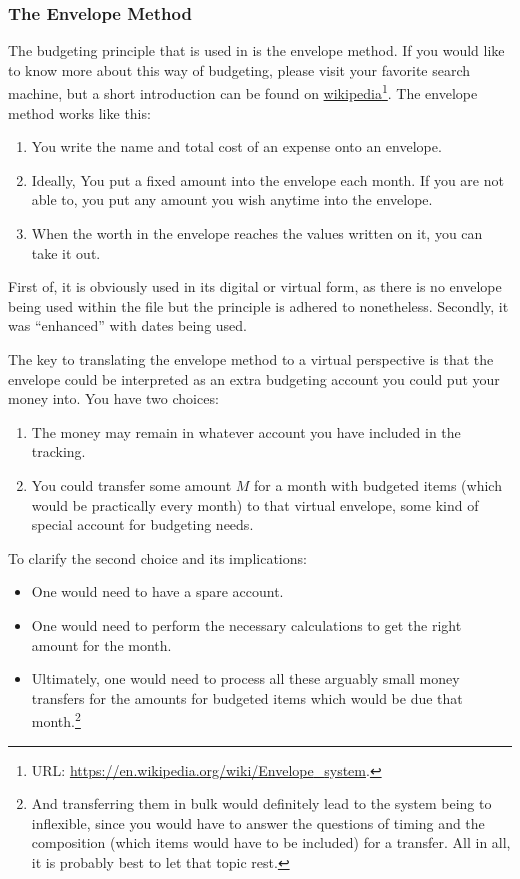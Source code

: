 \subsubsection{The Envelope Method}
\label{subsubsec:budgeting-the-envelope-method}

The budgeting principle that is used in \tfn is the envelope method.
If you would like to know more about this way of budgeting, please visit your favorite search machine, but a short introduction can be found on \href{https://en.wikipedia.org/wiki/Envelope_system}{wikipedia}\footnote{URL: \href{https://en.wikipedia.org/wiki/Envelope_system}{https://en.wikipedia.org/wiki/Envelope{\_}system}.}.
The envelope method works like this:
\begin{enumerate}
	\item You write the name and total cost of an expense onto an envelope.
	\item Ideally, You put a fixed amount into the envelope each month.
	If you are not able to, you put any amount you wish anytime into the envelope.
	\item When the worth in the envelope reaches the values written on it, you can take it out.
\end{enumerate}
First of, it is obviously used in its digital or virtual form, as there is no envelope being used within the file but the principle is adhered to nonetheless.
Secondly, it was ``enhanced'' with dates being used.

The key to translating the envelope method to a virtual perspective is that the envelope could be interpreted as an extra budgeting account you could put your money into.
You have two choices:
\begin{enumerate}
	\item The money may remain in whatever account you have included in the tracking.
	\item You could transfer some amount \( M \) for a month with budgeted items (which would be practically every month) to that virtual envelope, \ie some kind of special account for budgeting needs.
\end{enumerate}

To clarify the second choice and its implications:
\begin{itemize}
	\item One would need to have a spare account.
	\item One would need to perform the necessary calculations to get the right amount for the month.
	\item Ultimately, one would need to process all these arguably small money transfers for the amounts for budgeted items which would be due that month.\footnote{And transferring them in bulk would definitely lead to the system being to inflexible, since you would have to answer the questions of timing and the composition (which items would have to be included) for a transfer.
	All in all, it is probably best to let that topic rest.}
\end{itemize}

